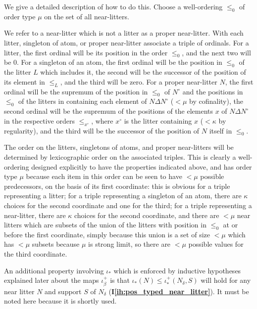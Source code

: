 \documentclass[112pt]{article}
\theoremstyle{definition}
\theoremstyle{remark}
\newcommand{\ihref}[1]{(\textbf{I\ref{#1}})}
\begin{document}
We give a detailed description of how to do this. Choose a well-ordering $\leq_0$ of order type $\mu$ on the set of all near-litters.  

We refer to a near-litter which is not a litter as a proper near-litter.  With each litter, singleton of atom, or proper near-litter associate a triple of ordinals.  For a litter, the first ordinal will be its position in the order $\leq_0$, and the next two will be 0.  For a singleton of an atom, the first ordinal will be the position in $\leq_0$ of the  litter $L$ which includes it, the second will be the successor of the position of its element in $\leq_L$, and the third will be zero.   For a proper near-litter $N$, the first ordinal will be the supremum of the position in $\leq_0$ of $N^\circ$ and the positions in $\leq_0$ of the litters in containing each element of $N\Delta N^\circ$ ($<\mu$ by cofinality), the second ordinal will be the supremum of the positions of the elements $x$ of $N \Delta N^\circ$ in the respective orders $\leq_{x^\circ}$, where $x^\circ$ is the litter containing $x$ ($<\kappa$ by regularity), and the third will be the successor of the position of $N$ itself in $\leq_0$.

The order on the litters, singletons of atoms, and proper near-litters will be determined by lexicographic order on the associated triples.  This is clearly a well-ordering designed explicitly to have the properties indicated above, and has order type $\mu$ because each item in this order can be seen to have $<\mu$ possible predecessors, on the basis of its first coordinate:  this is obvious for a triple representing a litter;  for a triple representing a singleton of an atom, there are $\kappa$ choices for the second coordinate and one for the third;  for a triple representing a near-litter, there are $\kappa$ choices for the second coordinate, and there are $<\mu$ near litters which are subsets of the union of the litters with position in $\leq_0$ at or before the first coordinate, simply because this union is a set of size $<\mu$ which has $<\mu$ subsets because $\mu$ is strong limit, so there are $<\mu$ possible values for the third coordinate.


An additional property involving $\iota_*$ which is enforced by inductive hypotheses explained later about the maps $\iota_\beta^+$ is that $\iota_*(N) \leq \iota_*^+(N_\delta,S)$ will hold for any near litter $N$ and support $S$ of $N_\delta$ \ihref{ih:pos_typed_near_litter}.  It must be noted here because it is shortly used.
\end{document}
